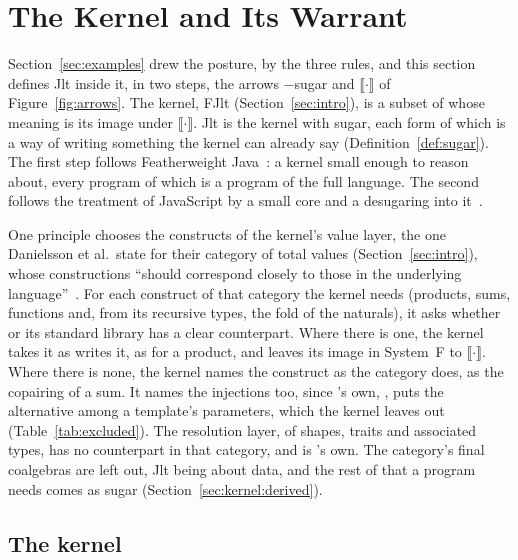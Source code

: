 \section{The Kernel and Its Warrant}
\label{sec:kernel}

Section~\ref{sec:examples} drew the posture, by the three rules, and this section defines Jlt inside it, in two steps, the arrows $-$sugar and $\llbracket\cdot\rrbracket$ of Figure~\ref{fig:arrows}.
The kernel, FJlt (Section~\ref{sec:intro}), is a subset of \Cpp{} whose meaning is its image under $\llbracket\cdot\rrbracket$.
Jlt is the kernel with sugar, each form of which is a way of writing something the kernel can already say (Definition~\ref{def:sugar}).
The first step follows Featherweight Java~\cite{igarashi2001featherweight}: a kernel small enough to reason about, every program of which is a program of the full language.
The second follows the treatment of JavaScript by a small core and a desugaring into it~\cite{guha2010essence}.

One principle chooses the constructs of the kernel's value layer, the one Danielsson et al.\ state for their category of total values (Section~\ref{sec:intro}), whose constructions ``should correspond closely to those in the underlying language''~\cite[Section~8]{danielsson2006fast}.
For each construct of that category the kernel needs (products, sums, functions and, from its recursive types, the fold of the naturals), it asks whether  or its standard library has a clear counterpart.
Where there is one, the kernel takes it as \Cpp{} writes it, as  for a product, and leaves its image in System~F to $\llbracket\cdot\rrbracket$.
Where there is none, the kernel names the construct as the category does, as the copairing of a sum.
It names the injections too, since \Cpp{}'s own, , puts the alternative among a template's parameters, which the kernel leaves out (Table~\ref{tab:excluded}).
The resolution layer, of shapes, traits and associated types, has no counterpart in that category, and is \Cpp{}'s own.
The category's final coalgebras are left out, Jlt being about data, and the rest of  that a program needs comes as sugar (Section~\ref{sec:kernel:derived}).

\subsection{The kernel}
\label{sec:kernel:fjlt}

